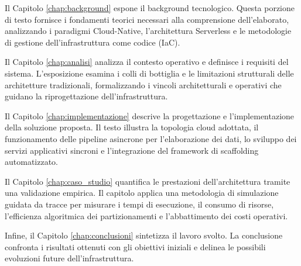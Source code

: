 Il Capitolo \ref{chap:background} espone il background tecnologico. Questa porzione di testo fornisce i fondamenti teorici necessari alla comprensione dell'elaborato, analizzando i paradigmi Cloud-Native, l'architettura Serverless e le metodologie di gestione dell'infrastruttura come codice (IaC).

Il Capitolo \ref{chap:analisi} analizza il contesto operativo e definisce i requisiti del sistema. L'esposizione esamina i colli di bottiglia e le limitazioni strutturali delle architetture tradizionali, formalizzando i vincoli architetturali e operativi che guidano la riprogettazione dell'infrastruttura.

Il Capitolo \ref{chap:implementazione} descrive la progettazione e l'implementazione della soluzione proposta. Il testo illustra la topologia cloud adottata, il funzionamento delle pipeline asincrone per l'elaborazione dei dati, lo sviluppo dei servizi applicativi sincroni e l'integrazione del framework di scaffolding automatizzato.

Il Capitolo \ref{chap:caso_studio} quantifica le prestazioni dell'architettura tramite una validazione empirica. Il capitolo applica una metodologia di simulazione guidata da tracce per misurare i tempi di esecuzione, il consumo di risorse, l'efficienza algoritmica dei partizionamenti e l'abbattimento dei costi operativi.

Infine, il Capitolo \ref{chap:conclusioni} sintetizza il lavoro svolto. La conclusione confronta i risultati ottenuti con gli obiettivi iniziali e delinea le possibili evoluzioni future dell'infrastruttura.